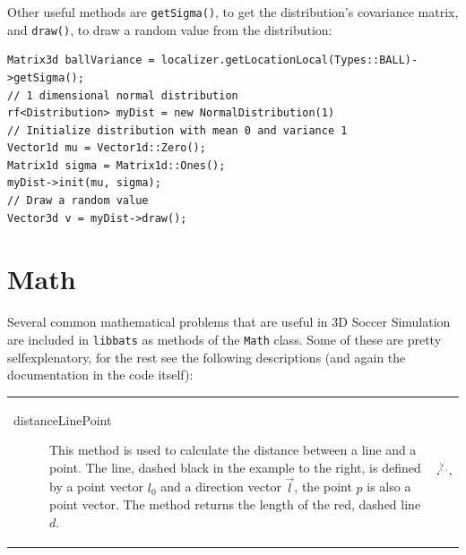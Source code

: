 Other useful methods are {\tt getSigma()}, to get the distribution's
covariance matrix, and {\tt draw()}, to draw a random value from the
distribution:
\begin{lstlisting}[frame=single]
Matrix3d ballVariance = localizer.getLocationLocal(Types::BALL)->getSigma();
// 1 dimensional normal distribution
rf<Distribution> myDist = new NormalDistribution(1)
// Initialize distribution with mean 0 and variance 1
Vector1d mu = Vector1d::Zero();
Matrix1d sigma = Matrix1d::Ones();
myDist->init(mu, sigma);
// Draw a random value
Vector3d v = myDist->draw();
\end{lstlisting}

\section{Math}
Several common mathematical problems that are useful in 3D Soccer
Simulation are included in {\tt libbats} as methods of the {\tt Math}
class. Some of these are pretty selfexplenatory, for the rest see the
following descriptions (and again the documentation in the code
itself):

\begin{tabular}{l l}
\begin{minipage}{0.7\textwidth}
\begin{description}
\item[distanceLinePoint] This method is used to calculate the distance
  between a line and a point. The line, dashed black in the example to
  the right, is defined by a point vector $l_0$ and a direction vector
  $\vec{l}$, the point $p$ is also a point vector. The method returns
  the length of the red, dashed line $d$.
\end{description}
\end{minipage}
&
\begin{minipage}{0.3\textwidth}
\includegraphics[width=2.5cm]{distlp.png}
\end{minipage}
\end{tabular}

